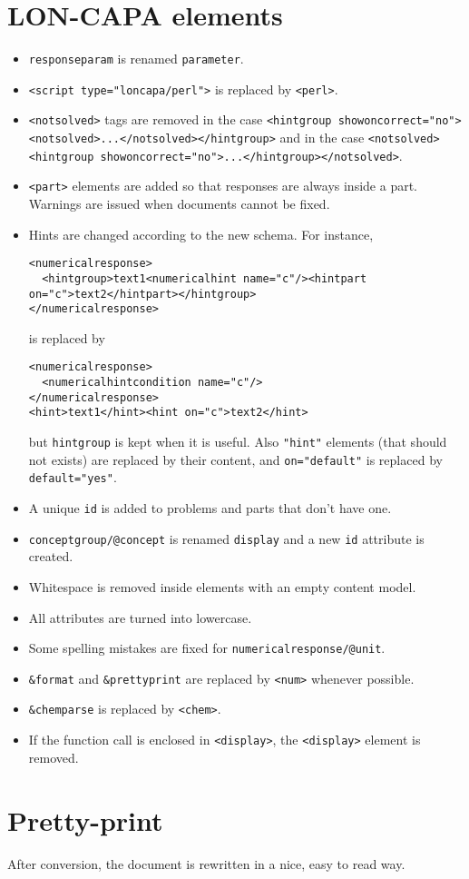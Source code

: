 \section{LON-CAPA elements}
\begin{itemize}
\item \texttt{responseparam} is renamed \texttt{parameter}.
\item \texttt{<script type="loncapa/perl">} is replaced by \texttt{<perl>}.
\item \texttt{<notsolved>} tags are removed in the case \texttt{<hintgroup showoncorrect="no"><notsolved>...</notsolved></hintgroup>}
and in the case \texttt{<notsolved><hintgroup showoncorrect="no">...</hintgroup></notsolved>}.
\item \texttt{<part>} elements are added so that responses are always inside a part. Warnings are issued when documents cannot be fixed.
\item Hints are changed according to the new schema.
For instance,
\begin{verbatim}
<numericalresponse>
  <hintgroup>text1<numericalhint name="c"/><hintpart on="c">text2</hintpart></hintgroup>
</numericalresponse>
\end{verbatim}
is replaced by
\begin{verbatim}
<numericalresponse>
  <numericalhintcondition name="c"/>
</numericalresponse>
<hint>text1</hint><hint on="c">text2</hint>
\end{verbatim}
but \texttt{hintgroup} is kept when it is useful.
Also \texttt{"hint"} elements (that should not exists) are replaced by their content, and \texttt{on="default"} is replaced by \texttt{default="yes"}.
\item A unique \texttt{id} is added to problems and parts that don't have one.
\item \texttt{conceptgroup/@concept} is renamed \texttt{display} and a new \texttt{id} attribute is created.
\item Whitespace is removed inside elements with an empty content model.
\item All attributes are turned into lowercase.
\item Some spelling mistakes are fixed for \texttt{numericalresponse/@unit}.
\item \texttt{\&format} and \texttt{\&prettyprint} are replaced by \texttt{<num>} whenever possible.
\item \texttt{\&chemparse} is replaced by \texttt{<chem>}.
\item If the function call is enclosed in \texttt{<display>}, the \texttt{<display>} element is removed.
\end{itemize}

\section{Pretty-print}
After conversion, the document is rewritten in a nice, easy to read way.

